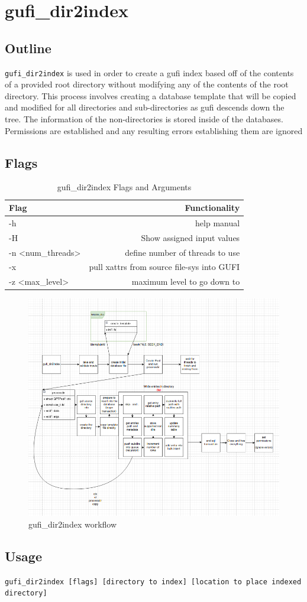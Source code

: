 \section{gufi\_dir2index}

\subsection{Outline}
\texttt{gufi\_dir2index} is used in order to create a gufi index based off of the contents of a provided root directory without modifying any of the contents of the root directory.  This process involves creating a database template that will be copied and modified for all directories and sub-directories as gufi descends down the tree. The information of the non-directories is stored inside of the databases. Permissions are established and any resulting errors establishing them are ignored

\subsection{Flags}

\begin{table} [h]
\centering
\begin{tabular}{l|r}
Flag & Functionality \\\hline
-h & help manual \\
-H & Show assigned input values \\
-n \textless num\_threads\textgreater  & define number of threads to use \\
-x & pull xattrs from source file-sys into GUFI \\
-z \textless max\_level\textgreater & maximum level to go down to
\end{tabular}
\caption{\label{fig:Flags_for_dir2index}gufi\_dir2index Flags and Arguments}
\end{table}

\begin{figure} [h]
\centering
\includegraphics[width=1.0\textwidth]{images/gufi_dir2index.png}
\caption{\label{fig:gufi_dir2index}gufi\_dir2index workflow}
\end{figure}

\subsection{Usage}
\texttt{gufi\_dir2index [flags] [directory to index] [location to place indexed directory]}
